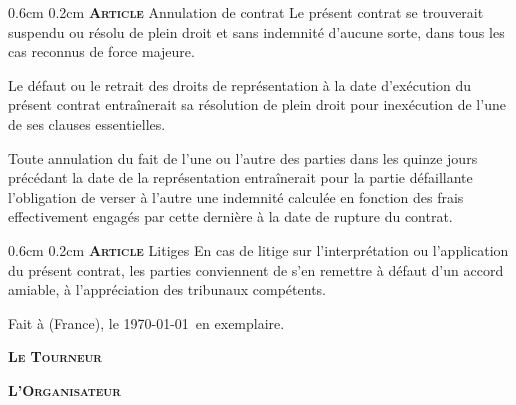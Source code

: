 \documentclass[a4paper,10pt]{article}
\makeatletter
\newcommand{\PR}{\textbf{\textsc{Le Tourneur}}}
\newcommand{\OR}{\textbf{\textsc{L'Organisateur}}}
\renewcommand\section{\@startsection{section}{1}{\z@}%
	{0.6cm}%
	{0.2cm}%
	{\noindent\large\bfseries\scshape Article }}
\renewcommand\subsection{\@startsection{subsection}{2}{1em}%
	{0.24cm}%
	{-0.5cm}%
	{\bfseries\scshape}}
\renewcommand\thesubsection{\thesection.\Roman{subsection})}
\makeatother
\begin{document}
\section{Annulation de contrat}
\label{sec:annulation}
Le pr\'esent contrat se trouverait suspendu ou r\'esolu de plein droit et
sans indemnit\'e d'aucune sorte, dans tous les cas reconnus de force
majeure.

Le d\'efaut ou le retrait des droits de repr\'esentation \`a la date
d'ex\'ecution du pr\'esent contrat entra\^inerait sa r\'esolution de plein
droit pour inex\'ecution de l'une de ses clauses essentielles.

Toute annulation du fait de l'une ou l'autre des parties dans les
quinze jours pr\'ec\'edant la date de la repr\'esentation entra\^inerait pour
la partie d\'efaillante l'obligation de verser \`a l'autre une indemnit\'e
calcul\'ee en fonction des frais effectivement engag\'es par cette
derni\`ere \`a la date de rupture du contrat.

\section{Litiges}
\label{sec:litiges}
En cas de litige sur l'interpr\'etation ou l'application du pr\'esent
contrat, les parties conviennent de s'en remettre \`a d\'efaut d'un accord
amiable, \`a l'appr\'eciation des tribunaux comp\'etents.

\vfill
Fait \`a \VILLEAMMD{} (France), le \today\ en \NBEX{} exemplaire.

\begin{minipage}[h!]{0.5\linewidth}
  \begin{center}
    \PR
  \end{center}
\end{minipage}
\begin{minipage}[h!]{0.5\linewidth}
  \begin{center}
    \OR
  \end{center}
\end{minipage}
\vspace{6cm}

\newpage
\appendix
\makeatletter
\renewcommand\section{\@startsection{section}{1}{\z@}%
	{1cm}%
	{0.2cm}%
	{\noindent\large\bfseries\scshape Annexe }}
\renewcommand\subsection{\@startsection{subsection}{2}{0.2em}%
	{0.24cm}%
	{0.1cm}%
	{\large\bfseries\scshape}}
\renewcommand\subsubsection{\@startsection{subsubsection}{3}{1em}%
	{0.24cm}%
	{-0.5cm}%
	{\bfseries\scshape}}
\makeatother
\renewcommand\thesubsection{\arabic{subsection}}
\end{document}
